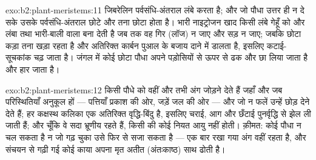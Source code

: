 \begin{solution}{exo:b2:plant-meristems:11}
जिबरेलिन पर्वसंधि-अंतराल लंबे करता है; और जो पौधा उत्तर ही न दे सके उसके
पर्वसंधि-अंतराल छोटे और तना छोटा होता है। भारी नाइट्रोजन खाद किसी
लंबे गेहूँ को और लंबा तथा भारी-बाली वाला बना देती है जब तक वह गिर
(लॉज) न जाए और सड़ न जाए; जबकि छोटा कड़ा तना खड़ा रहता है और अतिरिक्त
कार्बन पुआल के बजाय दाने में डालता है, इसलिए कटाई-सूचकांक चढ़ जाता है।
जंगल में कोई छोटा पौधा अपने पड़ोसियों से ऊपर से ढक और छा लिया जाता है
और हार जाता है।
\end{solution}

\begin{solution}{exo:b2:plant-meristems:12}
 किसी पौधे को वहीं और तभी अंग जोड़ने देते हैं जहाँ और जब
परिस्थितियाँ अनुकूल हों --- पत्तियाँ प्रकाश की ओर, जड़ें जल की ओर --- और
जो न फलें उन्हें छोड़ देने देते हैं; हर कक्षस्थ कलिका एक अतिरिक्त
वृद्धि-बिंदु है, इसलिए चराई, आग और छँटाई पुनर्वृद्धि से झेल ली जाती हैं;
और चूँकि वे  सदा भ्रूणीय रहते हैं, किसी  की कोई
नियत आयु नहीं होती। क़ीमत: कोई पौधा न चल सकता है न जो गढ़ चुका उसे फिर से
सजा सकता है --- एक बार रखा गया अंग वहीं रहता है, और संचयन से गढ़ी गई कोई
काया अपना मृत अतीत (अंतःकाष्ठ) साथ ढोती है।
\end{solution}

